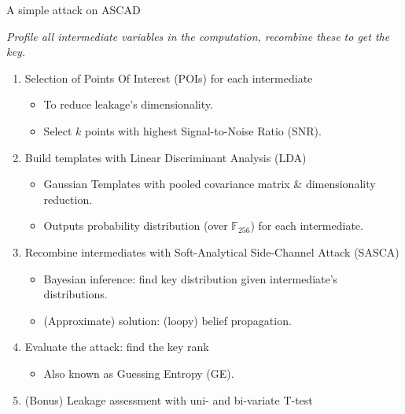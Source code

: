 \documentclass[aspectratio=169]{beamer}
\begin{document}
\begin{frame}{A simple attack on ASCAD}
    \begin{center}
        \emph{Profile all intermediate variables in the computation, recombine these to get the key.}
    \end{center}
    \pause

    \begin{enumerate}[<+->]
        \item Selection of Points Of Interest (POIs) for each intermediate
            \begin{itemize}[<.->]
                \item To reduce leakage's dimensionality.
                \item Select $k$ points with highest Signal-to-Noise Ratio (SNR).
            \end{itemize}
        \item Build templates with Linear Discriminant Analysis (LDA)
            \begin{itemize}[<.->]
                \item Gaussian Templates with pooled covariance matrix \& dimensionality reduction.
                \item Outputs probability distribution (over $\mathbb{F}_{256}$) for each intermediate.
            \end{itemize}
        \item Recombine intermediates with Soft-Analytical Side-Channel Attack (SASCA)
            \begin{itemize}[<.->]
                \item Bayesian inference: find key distribution given intermediate's distributions.
                \item (Approximate) solution: (loopy) belief propagation.
            \end{itemize}
        \item Evaluate the attack: find the key rank
            \begin{itemize}
                \item Also known as Guessing Entropy (GE).
            \end{itemize}
        \item (Bonus) Leakage assessment with uni- and bi-variate T-test
    \end{enumerate}

\end{frame}
\end{document}

